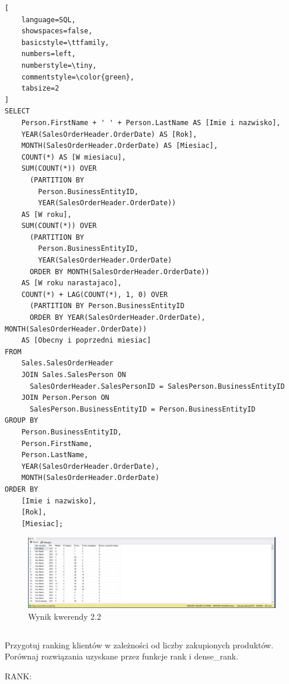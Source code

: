 \documentclass[a4paper,12pt]{article}
\begin{document}
  {\small
    \begin{lstlisting}[
	language=SQL,
	showspaces=false,
	basicstyle=\ttfamily,
	numbers=left,
	numberstyle=\tiny,
	commentstyle=\color{green},
	tabsize=2
]
SELECT 
    Person.FirstName + ' ' + Person.LastName AS [Imie i nazwisko],
    YEAR(SalesOrderHeader.OrderDate) AS [Rok],
    MONTH(SalesOrderHeader.OrderDate) AS [Miesiac],
    COUNT(*) AS [W miesiacu],
    SUM(COUNT(*)) OVER 
      (PARTITION BY
        Person.BusinessEntityID, 
        YEAR(SalesOrderHeader.OrderDate)) 
    AS [W roku],
    SUM(COUNT(*)) OVER 
      (PARTITION BY 
        Person.BusinessEntityID, 
        YEAR(SalesOrderHeader.OrderDate)                 
      ORDER BY MONTH(SalesOrderHeader.OrderDate)) 
    AS [W roku narastajaco],
    COUNT(*) + LAG(COUNT(*), 1, 0) OVER 
      (PARTITION BY Person.BusinessEntityID 
      ORDER BY YEAR(SalesOrderHeader.OrderDate), MONTH(SalesOrderHeader.OrderDate)) 
    AS [Obecny i poprzedni miesiac]
FROM 
    Sales.SalesOrderHeader
    JOIN Sales.SalesPerson ON 
      SalesOrderHeader.SalesPersonID = SalesPerson.BusinessEntityID
    JOIN Person.Person ON 
      SalesPerson.BusinessEntityID = Person.BusinessEntityID
GROUP BY 
    Person.BusinessEntityID,
    Person.FirstName,
    Person.LastName,
    YEAR(SalesOrderHeader.OrderDate),
    MONTH(SalesOrderHeader.OrderDate)
ORDER BY 
    [Imie i nazwisko],
    [Rok],
    [Miesiac];
\end{lstlisting}}

\begin{figure}[H]
  \centering
  \includegraphics[width=1.0\textwidth]{images/2.2.png}
  \caption{Wynik kwerendy 2.2}
\end{figure}

\subsection{}

Przygotuj ranking klientów w zależności od liczby zakupionych produktów. Porównaj rozwiązania uzyskane przez funkcje rank i dense\_rank.

RANK:
\end{document}
